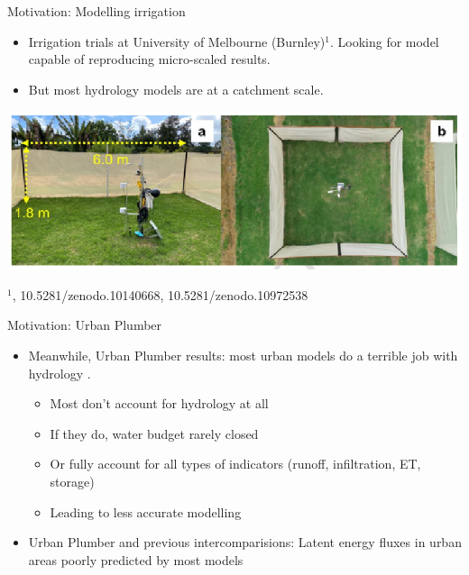 \documentclass{beamer}
\begin{document}
%


\begin{frame}{Motivation: Modelling irrigation} 

\begin{itemize}
\item Irrigation trials at University of Melbourne (Burnley)$^{1}$. Looking for model capable of reproducing micro-scaled results.\\ 
\item But most hydrology models are at a catchment scale.
\end{itemize}
\begin{center}
\includegraphics[scale=0.60]{Screenshot_20250703_100546.png}
\end{center}
$^{1}${\footnotesize \cite{Cheung2024}, 10.5281/zenodo.10140668, 10.5281/zenodo.10972538}
\end{frame}






\begin{frame}{Motivation: Urban Plumber} 
\begin{itemize}

\item Meanwhile, Urban Plumber results: most urban models do a terrible job with hydrology {\footnotesize \citep{jongen_water_2024}}.
\begin{itemize}
\item Most don't account for hydrology at all
\item If they do, water budget rarely closed
\item Or fully account for all types of indicators (runoff, infiltration, ET, storage)
\item Leading to less accurate modelling
\end{itemize}
\item Urban Plumber and previous intercomparisions: Latent energy fluxes in urban areas poorly predicted by most models {\footnotesize \citep{lipson_evaluation_2024,grimmond_initial_2011}}
\end{itemize}
\end{frame}
\end{document}
